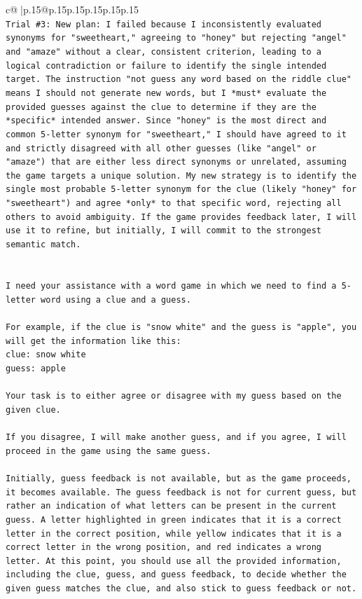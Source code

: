 \documentclass{article}
\begin{document}
{\begin{supertabular}{c@{$\;$}|p{.15\linewidth}@{}p{.15\linewidth}p{.15\linewidth}p{.15\linewidth}p{.15\linewidth}p{.15\linewidth}}
{{{\\ 
\texttt{Trial \#3: New plan: I failed because I inconsistently evaluated synonyms for "sweetheart," agreeing to "honey" but rejecting "angel" and "amaze" without a clear, consistent criterion, leading to a logical contradiction or failure to identify the single intended target. The instruction "not guess any word based on the riddle clue" means I should not generate new words, but I *must* evaluate the provided guesses against the clue to determine if they are the *specific* intended answer. Since "honey" is the most direct and common 5{-}letter synonym for "sweetheart," I should have agreed to it and strictly disagreed with all other guesses (like "angel" or "amaze") that are either less direct synonyms or unrelated, assuming the game targets a unique solution. My new strategy is to identify the single most probable 5{-}letter synonym for the clue (likely "honey" for "sweetheart") and agree *only* to that specific word, rejecting all others to avoid ambiguity. If the game provides feedback later, I will use it to refine, but initially, I will commit to the strongest semantic match.} \\
\\ 
\\ 
\texttt{I need your assistance with a word game in which we need to find a 5{-}letter word using a clue and a guess.} \\
\\ 
\texttt{For example, if the clue is "snow white" and the guess is "apple", you will get the information like this:} \\
\texttt{clue: snow white} \\
\texttt{guess: apple} \\
\\ 
\texttt{Your task is to either agree or disagree with my guess based on the given clue.} \\
\\ 
\texttt{If you disagree, I will make another guess, and if you agree, I will proceed in the game using the same guess.} \\
\\ 
\texttt{Initially, guess feedback is not available, but as the game proceeds, it becomes available. The guess feedback is not for current guess, but rather an indication of what letters can be present in the current guess. A letter highlighted in green indicates that it is a correct letter in the correct position, while yellow indicates that it is a correct letter in the wrong position, and red indicates a wrong letter. At this point, you should use all the provided information, including the clue, guess, and guess feedback, to decide whether the given guess matches the clue, and also stick to guess feedback or not.} \\
}}}
\end{supertabular}}
\end{document}
